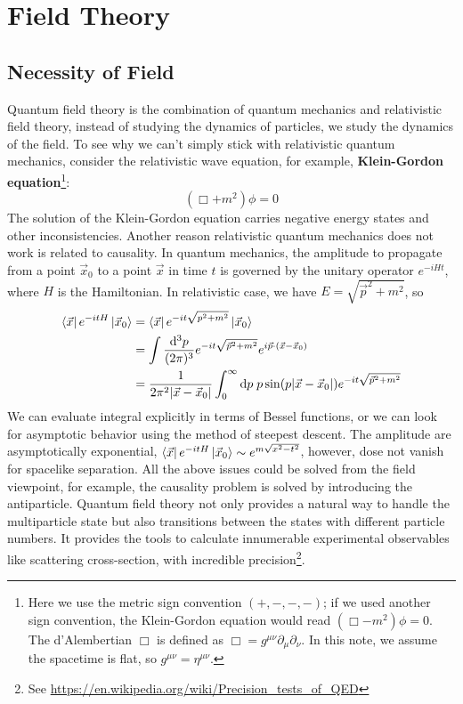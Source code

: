 \documentclass[12pt]{article}
\numberwithin{equation}{section}
\theoremstyle{1style}
\newcommand{\tbf}[1]{\textbf{#1}}
\newcommand{\p}{\partial}
\newcommand{\id}{\mathrm{d}}
\begin{document}
\newpage





\section{Field Theory}
\subsection{Necessity of Field}
Quantum field theory is the combination of quantum mechanics and relativistic field theory, 
instead of studying the dynamics of particles, we study the dynamics of the field.
To see why we can't simply stick with relativistic quantum mechanics, consider the relativistic 
wave equation, for example, \tbf{Klein-Gordon equation}\footnote{
  Here we use the metric sign convention \((+,-,-,-)\); if we used another sign convention, the Klein-Gordon equation
  would read \((\Box - m^2) \phi = 0\). The d'Alembertian \(\Box\) is defined as \(\Box = g^{\mu\nu}\p_{\mu}\p_{\nu}\).
  In this note, we assume the spacetime is flat, so \(g^{\mu\nu}=\eta^{\mu\nu}\).
}:
\begin{equation}\label{kg}
  (\Box +m^2)\phi=0
\end{equation}
The solution of the Klein-Gordon equation carries negative energy states and other inconsistencies.
Another reason relativistic quantum mechanics does not work is related to causality.
In quantum mechanics, the amplitude to propagate from a point \(\vec{x}_0\) to a point \(\vec{x}\) in time \(t\)
is governed by the unitary operator \(e^{-iHt}\), where \(H\) is the Hamiltonian.
In relativistic case, we have \(E=\sqrt{\vec{p}^2+m^2}\), so 
\begin{align}
  \bra{\vec{x}}e^{-itH}\ket{\vec{x}_0}&=\bra{\vec{x}}e^{-it\sqrt{p^2+m^2}}\ket{\vec{x}_0}\\
  &=\int\frac{\id^3p}{(2\pi)^3}e^{-it\sqrt{\vec{p}^2+m^2}}e^{i\vec{p}\cdot(\vec{x}-\vec{x}_0)}\\
  &=\frac{1}{2\pi^2|\vec{x}-\vec{x}_0|}\int_{0}^{\infty}\id p\;p\sin(p|\vec{x}-\vec{x}_0|)e^{-it\sqrt{\vec{p}^2+m^2}}
\end{align}
We can evaluate integral explicitly in terms of Bessel functions, or we can look for asymptotic behavior using the method of steepest descent.
The amplitude are asymptotically exponential, \(\bra{\vec{x}}e^{-itH}\ket{\vec{x}_0}\sim e^{m\sqrt{x^2-t^2}}\), however, dose not vanish for spacelike separation.
All the above issues could be solved from the field viewpoint, for example, the causality problem is solved by introducing the antiparticle. 
Quantum field theory not only provides a natural way to handle the multiparticle state but also transitions between the states
with different particle numbers. It provides the tools to calculate innumerable experimental observables like scattering cross-section,
with incredible precision\footnote{See \url{https://en.wikipedia.org/wiki/Precision_tests_of_QED}}. 
\end{document}
